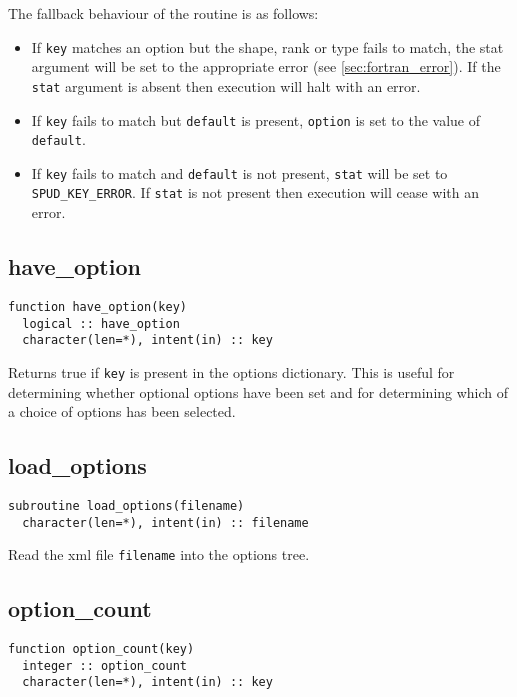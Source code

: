\documentclass[a4paper, 11pt]{book}
\begin{document}
The fallback behaviour of the routine is as follows:
\begin{itemize}
\item If \lstinline+key+ matches an option but the shape, rank or type fails
  to match, the stat argument will be set to the appropriate error (see
  \ref{sec:fortran_error}). If the \lstinline+stat+ argument is absent then execution
  will halt with an error.
\item If \lstinline+key+ fails to match but \lstinline+default+ is present,
  \lstinline+option+ is set to the value of \lstinline+default+.
\item If \lstinline+key+ fails to match and \lstinline+default+ is not
  present, \lstinline+stat+ will be set to \lstinline+SPUD_KEY_ERROR+. If
  \lstinline+stat+ is not present then execution will cease with an error.
\end{itemize}

\subsection{have\_option}

\begin{lstlisting}
function have_option(key)
  logical :: have_option
  character(len=*), intent(in) :: key
\end{lstlisting}

Returns true if \lstinline+key+ is present in the options
dictionary. This is useful for determining whether optional options have
been set and for determining which of a choice of options has been selected.

\subsection{load\_options}

\begin{lstlisting}
subroutine load_options(filename) 
  character(len=*), intent(in) :: filename
\end{lstlisting}

Read the xml file \lstinline+filename+ into the options tree.

\subsection{option\_count}

\begin{lstlisting}
function option_count(key)
  integer :: option_count
  character(len=*), intent(in) :: key
\end{lstlisting}
\end{document}
